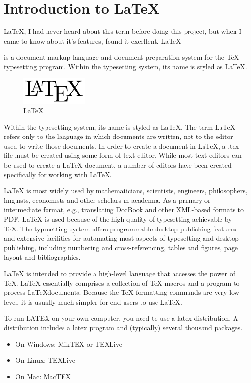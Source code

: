 
\section{Introduction to \LaTeX}

\LaTeX, I had never heard about this term before doing this project,
but when I came to know about it's features, found it excellent. 
\LaTeX{ is a document markup language and document preparation system for the \TeX{} 
typesetting program. Within the typesetting system, its name is styled 
as \LaTeX.

\begin{figure}[!ht]
\centering
\includegraphics[width=0.3\textwidth]{input/images/latex.png}                   
\caption{\LaTeX} 
\hspace{-1.5em}
\end{figure}

Within the typesetting system, its name is styled as \LaTeX. The term 
\LaTeX{} refers only to the language in which documents are written, 
not to the editor used to write those documents. In order to create a 
document in \LaTeX, a .tex file must be created using some form of text 
editor. While most text editors can be used to create a \LaTeX{} document, 
a number of editors have been created specifically for working with \LaTeX.

\LaTeX{} is most widely used by mathematicians, scientists, 
engineers, philosophers, linguists, economists and other scholars in 
academia. As a primary or intermediate format, e.g., translating DocBook 
and other XML-based formats to PDF, \LaTeX{} is used because of the 
high quality of typesetting achievable by \TeX. The typesetting system 
offers programmable desktop publishing features and extensive facilities 
for automating most aspects of typesetting and desktop publishing, 
including numbering and cross-referencing, tables and figures, 
page layout and bibliographies.

\LaTeX{} is intended to provide a high-level language that
accesses the power of \TeX. \LaTeX{} essentially comprises a
collection of \TeX{} macros and a program to process \LaTeX documents. 
Because the \TeX{} formatting commands are very low-level, it is usually 
much simpler for end-users to use \LaTeX{}.

To run LATEX on your own computer, you need  to use a latex distribution. A distribution includes a latex program and (typically) several thousand packages.
\begin{itemize}
  \item  On Windows: MikTEX or TEXLive
   \item On Linux: TEXLive
  \item  On Mac: MacTEX
\end{itemize}
\newpage
}
